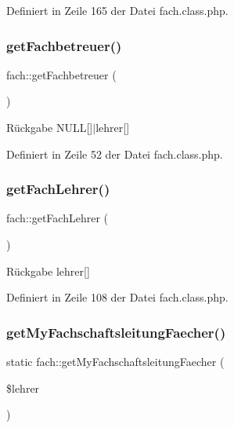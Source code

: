 Definiert in Zeile 165 der Datei fach.\+class.\+php.

\mbox{\label{classfach_a50b3eefb5de55bc8271101dcbc7c403e}} 
\subsubsection{\texorpdfstring{get\+Fachbetreuer()}{getFachbetreuer()}}
{\footnotesize\ttfamily fach\+::get\+Fachbetreuer (\begin{DoxyParamCaption}{ }\end{DoxyParamCaption})}

\begin{DoxyReturn}{Rückgabe}
N\+U\+LL\mbox{[}\mbox{]}$\vert$lehrer\mbox{[}\mbox{]} 
\end{DoxyReturn}


Definiert in Zeile 52 der Datei fach.\+class.\+php.

\mbox{\label{classfach_ae3203656307692c082b24827b4f6252f}} 
\subsubsection{\texorpdfstring{get\+Fach\+Lehrer()}{getFachLehrer()}}
{\footnotesize\ttfamily fach\+::get\+Fach\+Lehrer (\begin{DoxyParamCaption}{ }\end{DoxyParamCaption})}

\begin{DoxyReturn}{Rückgabe}
lehrer\mbox{[}\mbox{]} 
\end{DoxyReturn}


Definiert in Zeile 108 der Datei fach.\+class.\+php.

\mbox{\label{classfach_afbc97bc7897a0412cf6aafd73b6cdd8a}} 
\subsubsection{\texorpdfstring{get\+My\+Fachschaftsleitung\+Faecher()}{getMyFachschaftsleitungFaecher()}}
{\footnotesize\ttfamily static fach\+::get\+My\+Fachschaftsleitung\+Faecher (\begin{DoxyParamCaption}\item[{}]{\$lehrer }\end{DoxyParamCaption})\hspace{0.3cm}{\ttfamily [static]}}


